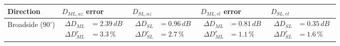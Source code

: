 \documentclass[10 pt,a4paper,twocolumn]{article}
\begin{document}
{\begin{table}[bt!]
	\begin{center}
		{	\begin{tabular}{|m{3cm}|m{3.4cm}|m{3.4cm}|m{3.4cm}|m{3.4cm}|}
				\hline
				\textbf{Direction} & \textbf{$D_{ML,az}$ error} & \textbf{$D_{SL,az}$} & \textbf{$D_{ML,el}$ error} & \textbf{$D_{SL,el}$} \\
				\hline 
				Broadside ($90^\circ$) &
				
						$\begin{aligned}
							\Delta D_{ML}&=	2.39\,dB\\
							\Delta D_{ML}^r &=3.3\,\%
						\end{aligned}$ 
					
			 & 
				
						$\begin{aligned}\Delta D_{SL}&=0.96\,dB \\
						\Delta D_{SL}^r&=2.7\,\%\end{aligned}$ 

				 & $\begin{aligned}
						\Delta D_{ML}&=0.81\,dB\\
						\Delta D_{ML}^r&=1.1\,\%
					\end{aligned}$
				 & $\begin{aligned}
				 	\Delta D_{SL}&=0.35\,dB\\
				 	\Delta D_{SL}^r&=1.6\,\%	\end{aligned}$
			 \\
				\hline
				
			

\end{tabular}}
\end{center}
\end{table}}
\end{document}
